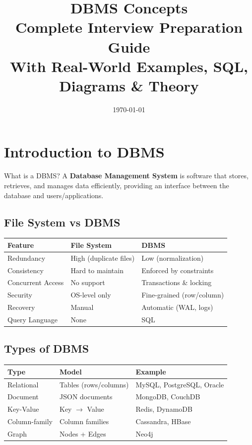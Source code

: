 \documentclass[12pt,a4paper]{article}
\title{
    \vspace{-1cm}
    {\Huge\textbf{DBMS Concepts}}\\[0.3cm]
    {\LARGE Complete Interview Preparation Guide}\\[0.3cm]
    {\large With Real-World Examples, SQL, Diagrams \& Theory}
}
\author{}
\date{\today}
\begin{document}
\maketitle
\thispagestyle{fancy}
\tableofcontents
\newpage

\section{Introduction to DBMS}

\begin{conceptbox}{What is a DBMS?}
A \textbf{Database Management System} is software that stores, retrieves, and manages data efficiently, providing an interface between the database and users/applications.
\end{conceptbox}

\subsection{File System vs DBMS}
\begin{center}
\begin{tabular}{@{}l p{4.5cm} p{4.5cm}@{}}
\toprule
\textbf{Feature} & \textbf{File System} & \textbf{DBMS} \\
\midrule
Redundancy & High (duplicate files) & Low (normalization) \\
Consistency & Hard to maintain & Enforced by constraints \\
Concurrent Access & No support & Transactions \& locking \\
Security & OS-level only & Fine-grained (row/column) \\
Recovery & Manual & Automatic (WAL, logs) \\
Query Language & None & SQL \\
\bottomrule
\end{tabular}
\end{center}

\subsection{Types of DBMS}
\begin{center}
\begin{tabular}{@{}l l l@{}}
\toprule
\textbf{Type} & \textbf{Model} & \textbf{Example} \\
\midrule
Relational & Tables (rows/columns) & MySQL, PostgreSQL, Oracle \\
Document & JSON documents & MongoDB, CouchDB \\
Key-Value & Key $\rightarrow$ Value & Redis, DynamoDB \\
Column-family & Column families & Cassandra, HBase \\
Graph & Nodes + Edges & Neo4j \\
\bottomrule
\end{tabular}
\end{center}
\end{document}
